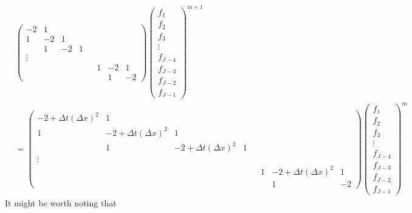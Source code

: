 \documentclass[a4paper]{article}
\theoremstyle{definition}
\begin{document}
\begin{align*}
    &\begin{pmatrix}
        -2 & 1 \\
        1 & -2 & 1 \\
        & 1 & -2 & 1 \\
        \vdots \\
        & & & & & 1 & -2 & 1 \\
        & & & & & & 1 & -2
    \end{pmatrix}
    \begin{pmatrix}
        f_1 \\
        f_2 \\
        f_3 \\
        \vdots \\
        f_{J-4} \\
        f_{J-3} \\
        f_{J-2} \\
        f_{J-1}
    \end{pmatrix}^{m+1}
    \\
    &=
    \begin{pmatrix}
        -2 + \Delta t (\Delta x)^2 & 1 \\
        1 & -2 + \Delta t (\Delta x)^2  & 1 \\
        & 1 & -2 + \Delta t (\Delta x)^2 & 1 \\
        \vdots \\
        & & & & & 1 & -2 + \Delta t (\Delta x)^2 & 1 \\
        & & & & & & 1 & -2
    \end{pmatrix}
    \begin{pmatrix}
        f_1 \\
        f_2 \\
        f_3 \\
        \vdots \\
        f_{J-4} \\
        f_{J-3} \\
        f_{J-2} \\
        f_{J-1}
    \end{pmatrix}^{m}
\end{align*}
It might be worth noting that
\end{document}
